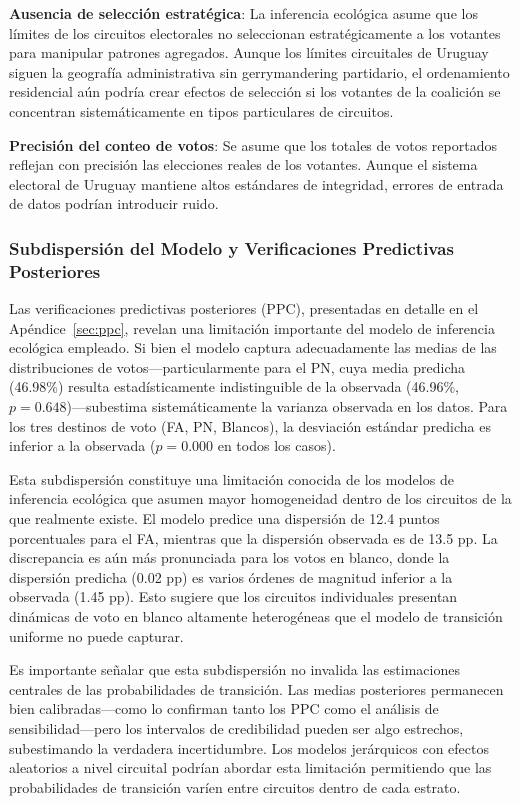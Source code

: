 \textbf{Ausencia de selección estratégica}: La inferencia ecológica asume que los límites de los circuitos electorales no seleccionan estratégicamente a los votantes para manipular patrones agregados. Aunque los límites circuitales de Uruguay siguen la geografía administrativa sin gerrymandering partidario, el ordenamiento residencial aún podría crear efectos de selección si los votantes de la coalición se concentran sistemáticamente en tipos particulares de circuitos.

\textbf{Precisión del conteo de votos}: Se asume que los totales de votos reportados reflejan con precisión las elecciones reales de los votantes. Aunque el sistema electoral de Uruguay mantiene altos estándares de integridad, errores de entrada de datos podrían introducir ruido.

\subsubsection{Subdispersión del Modelo y Verificaciones Predictivas Posteriores}

Las verificaciones predictivas posteriores (PPC), presentadas en detalle en el Apéndice~\ref{sec:ppc}, revelan una limitación importante del modelo de inferencia ecológica empleado. Si bien el modelo captura adecuadamente las medias de las distribuciones de votos---particularmente para el PN, cuya media predicha (46.98\%) resulta estadísticamente indistinguible de la observada (46.96\%, $p = 0.648$)---subestima sistemáticamente la varianza observada en los datos. Para los tres destinos de voto (FA, PN, Blancos), la desviación estándar predicha es inferior a la observada ($p = 0.000$ en todos los casos).

Esta subdispersión constituye una limitación conocida de los modelos de inferencia ecológica que asumen mayor homogeneidad dentro de los circuitos de la que realmente existe. El modelo predice una dispersión de 12.4 puntos porcentuales para el FA, mientras que la dispersión observada es de 13.5 pp. La discrepancia es aún más pronunciada para los votos en blanco, donde la dispersión predicha (0.02 pp) es varios órdenes de magnitud inferior a la observada (1.45 pp). Esto sugiere que los circuitos individuales presentan dinámicas de voto en blanco altamente heterogéneas que el modelo de transición uniforme no puede capturar.

Es importante señalar que esta subdispersión no invalida las estimaciones centrales de las probabilidades de transición. Las medias posteriores permanecen bien calibradas---como lo confirman tanto los PPC como el análisis de sensibilidad---pero los intervalos de credibilidad pueden ser algo estrechos, subestimando la verdadera incertidumbre. Los modelos jerárquicos con efectos aleatorios a nivel circuital podrían abordar esta limitación permitiendo que las probabilidades de transición varíen entre circuitos dentro de cada estrato.

